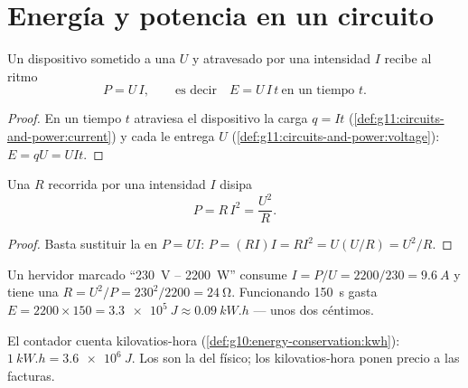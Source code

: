 \section{Energía y potencia en un circuito}

\begin{proposition}\label{prop:g11:circuits-and-power:power}
Un dispositivo sometido a una  $U$ y atravesado por una
intensidad $I$ recibe  al ritmo
\[ P = U\,I , \qquad\text{es decir}\quad E = U\,I\,t \ \text{en un tiempo } t . \]
\end{proposition}

\begin{proof}
En un tiempo $t$ atraviesa el dispositivo la carga $q = It$
(\cref{def:g11:circuits-and-power:current}) y cada  le entrega
$U$  (\cref{def:g11:circuits-and-power:voltage}): $E = qU = UIt$.
\end{proof}

\begin{proposition}\label{prop:g11:circuits-and-power:ri2}
Una  $R$ recorrida por una intensidad $I$ disipa
\[ P = R\,I^2 = \frac{U^2}{R} . \]
\end{proposition}

\begin{proof}
Basta sustituir la  en $P = UI$:
$P = (RI)I = RI^2 = U(U/R) = U^2/R$.
\end{proof}

\begin{example}\label{ex:g11:circuits-and-power:nameplate}
Un hervidor marcado ``\qty{230}{V} -- \qty{2200}{W}'' consume
$I = P/U = 2200/230 = \qty{9.6}{A}$ y tiene una 
$R = U^2/P = 230^2/2200 = \qty{24}{\ohm}$. Funcionando \qty{150}{s}
gasta $E = 2200 \times 150 = \qty{3.3e5}{J} \approx \qty{0.09}{kW.h}$
--- unos dos céntimos.
\end{example}

\begin{remark}\label{rem:g11:circuits-and-power:kwh}
El contador cuenta kilovatios-hora
(\cref{def:g10:energy-conservation:kwh}):
$\qty{1}{kW.h} = \qty{3.6e6}{J}$. Los  son la  del físico;
los kilovatios-hora ponen precio a las facturas.
\end{remark}

